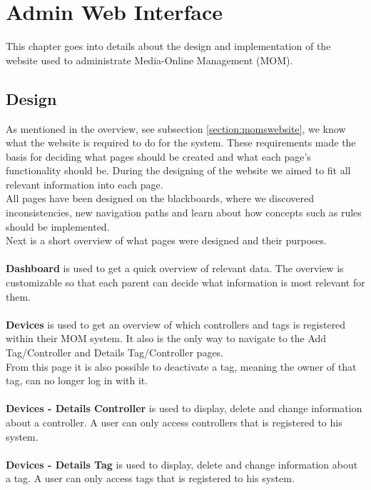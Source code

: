 \chapter{Admin Web Interface}
This chapter goes into details about the design and implementation of the website used to administrate Media-Online Management (MOM).

\section{Design}
As mentioned in the overview, see subsection \vref{section:momswebsite}, we know what the website is required to do for the system.
These requirements made the basis for deciding what pages should be created and what each page's functionality should be. During the designing of the website we aimed to fit all relevant information into each page.\\
All pages have been designed on the blackboards, where we discovered inconsistencies, new navigation paths and learn about how concepts such as rules should be implemented.\\
Next is a short overview of what pages were designed and their purposes.\\
\\
\textbf{Dashboard} is used to get a quick overview of relevant data. The overview is customizable so that each parent can decide what information is most relevant for them.\\
\\
\textbf{Devices} is used to get an overview of which controllers and tags is registered within their MOM system. It also is the only way to navigate to the Add Tag/Controller and Details Tag/Controller pages.\\
From this page it is also possible to deactivate a tag, meaning the owner of that tag, can no longer log in with it.\\
\\
\textbf{Devices - Details Controller} is used to display, delete and change information about a controller. A user can only access controllers that is registered to his system.\\
\\
\textbf{Devices - Details Tag} is used to display, delete and change information about a tag. A user can only access tags that is registered to his system.\\
